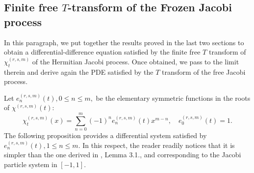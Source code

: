 \documentclass[12pt,reqno]{amsart}
\begin{document}
\subsection{Finite free \texorpdfstring{$T$}{T}-transform of the Frozen Jacobi process}
In this paragraph, we put together the results proved in the last two sections to obtain a differential-difference equation satisfied by the finite free
$T$ transform of $\chi^{(r,s,m)}_t$ of the Hermitian Jacobi process. Once obtained, we pass to the limit therein and derive again the PDE satisfied by the $T$ transform of the free Jacobi process. 

Let $e^{(r,s,m)}_n(t), 0 \leq n \leq m,$ be the elementary symmetric functions in the roots of $\chi^{(r,s,m)}(t)$: 
$$
\chi_t^{(r,s,m)}(x) = \sum_{n=0}^m (-1)^n e_n^{(r,s,m)}(t)x^{m-n}, \quad e_0^{(r,s,m)}(t) = 1.
$$
The following proposition provides a differential system satisfied by $e^{(r,s,m)}_n(t), 1 \leq n \leq m$. In this respect, the reader readily notices that it is simpler than the one 
derived in \cite{MR4092353}, Lemma 3.1., and corresponding to the Jacobi particle system in $[-1,1]$. 
\end{document}
